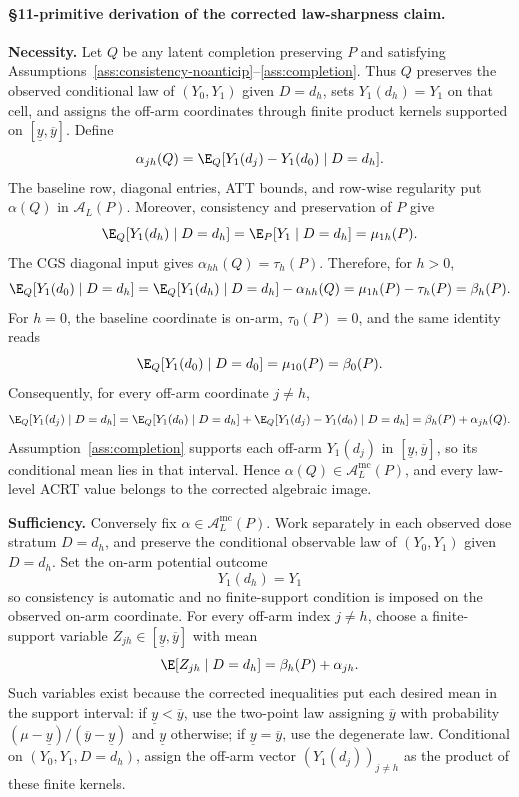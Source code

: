 \paragraph{\S11-primitive derivation of the corrected law-sharpness claim.}
\textbf{Necessity.} Let \(Q\) be any latent completion preserving \(P\) and
satisfying Assumptions~\ref{ass:consistency-noanticip}--\ref{ass:completion}.
Thus \(Q\) preserves the observed conditional law of \((Y_0,Y_1)\) given
\(D=d_h\), sets \(Y_1(d_h)=Y_1\) on that cell, and assigns the off-arm
coordinates through finite product kernels supported on
\([\underline y,\overline y]\).  Define
\[
  \alpha_{j h}(Q)
  =
  \E_Q[Y_1(d_j)-Y_1(d_0)\mid D=d_h].
\]
The baseline row, diagonal entries, ATT bounds, and row-wise regularity put
\(\alpha(Q)\) in \(\mathcal A_L(P)\).  Moreover, consistency and preservation
of \(P\) give
\[
  \E_Q[Y_1(d_h)\mid D=d_h]
  =
  \E_P[Y_1\mid D=d_h]
  =
  \mu_{1h}(P).
\]
The CGS diagonal input gives \(\alpha_{hh}(Q)=\tau_h(P)\).  Therefore, for
\(h>0\),
\[
  \E_Q[Y_1(d_0)\mid D=d_h]
  =
  \E_Q[Y_1(d_h)\mid D=d_h]-\alpha_{hh}(Q)
  =
  \mu_{1h}(P)-\tau_h(P)
  =
  \beta_h(P).
\]
For \(h=0\), the baseline coordinate is on-arm, \(\tau_0(P)=0\), and the same
identity reads
\[
  \E_Q[Y_1(d_0)\mid D=d_0]=\mu_{10}(P)=\beta_0(P).
\]
Consequently, for every off-arm coordinate \(j\ne h\),
\[
  \E_Q[Y_1(d_j)\mid D=d_h]
  =
  \E_Q[Y_1(d_0)\mid D=d_h]
  +
  \E_Q[Y_1(d_j)-Y_1(d_0)\mid D=d_h]
  =
  \beta_h(P)+\alpha_{j h}(Q).
\]
Assumption~\ref{ass:completion} supports each off-arm \(Y_1(d_j)\) in
\([\underline y,\overline y]\), so its conditional mean lies in that interval.
Hence \(\alpha(Q)\in\mathcal A_L^{\mathrm{mc}}(P)\), and every law-level ACRT
value belongs to the corrected algebraic image.

\textbf{Sufficiency.} Conversely fix
\(\alpha\in\mathcal A_L^{\mathrm{mc}}(P)\).  Work separately in each observed
dose stratum \(D=d_h\), and preserve the conditional observable law of
\((Y_0,Y_1)\) given \(D=d_h\).  Set the on-arm potential outcome
\[
  Y_1(d_h)=Y_1
\]
so consistency is automatic and no finite-support condition is imposed on the
observed on-arm coordinate.  For every off-arm index \(j\ne h\), choose a
finite-support variable \(Z_{jh}\in[\underline y,\overline y]\) with mean
\[
  \E[Z_{jh}\mid D=d_h]=\beta_h(P)+\alpha_{jh}.
\]
Such variables exist because the corrected inequalities put each desired mean
in the support interval: if \(\underline y<\overline y\), use the two-point
law assigning \(\overline y\) with probability
\((\mu-\underline y)/(\overline y-\underline y)\) and \(\underline y\)
otherwise; if \(\underline y=\overline y\), use the degenerate law.  Conditional
on \((Y_0,Y_1,D=d_h)\), assign the off-arm vector
\((Y_1(d_j))_{j\ne h}\) as the product of these finite kernels.

